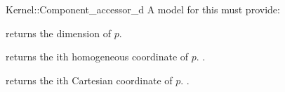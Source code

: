 \begin{ccRefFunctionObjectConcept}{Kernel::Component_accessor_d}
A model for this must provide:


{returns the dimension of $p$.}

{returns the ith homogeneous coordinate of $p$.
\ccPrecond {}.}

{returns the ith Cartesian coordinate of $p$.
\ccPrecond {}.}

\end{ccRefFunctionObjectConcept}
